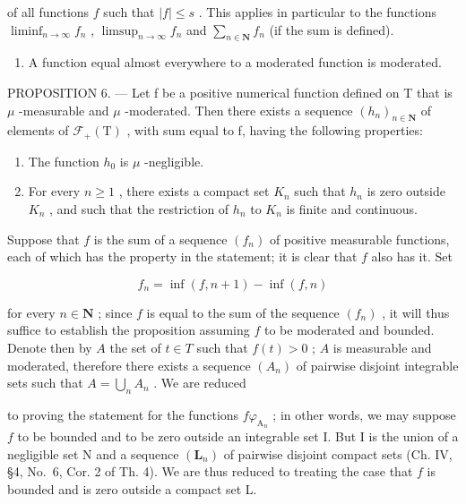 of all functions \(f\) such that \(|f| \leqslant s\) . This applies in particular to the functions \(\liminf_{n \to \infty} f_n\) , \(\limsup_{n \to \infty} f_n\) and \(\sum_{n \in \mathbf{N}} f_n\) (if the sum is defined).

\begin{enumerate}
\def\labelenumi{\arabic{enumi})}
\setcounter{enumi}{3}
\tightlist
\item
  A function equal almost everywhere to a moderated function is moderated.
\end{enumerate}

PROPOSITION 6. --- Let f be a positive numerical function defined on T that is \(\mu\) -measurable and \(\mu\) -moderated. Then there exists a sequence \((h_{n})_{n\in\mathbf{N}}\) of elements of \(\mathcal{F}_{+}(\mathrm{T})\) , with sum equal to f, having the following properties:

\begin{enumerate}
\def\labelenumi{\arabic{enumi})}
\item
  The function \(h_0\) is \(\mu\) -negligible.
\item
  For every \(n \geqslant 1\) , there exists a compact set \(K_{n}\) such that \(h_{n}\) is zero outside \(K_{n}\) , and such that the restriction of \(h_{n}\) to \(K_{n}\) is finite and continuous.
\end{enumerate}

Suppose that \(f\) is the sum of a sequence \((f_n)\) of positive measurable functions, each of which has the property in the statement; it is clear that \(f\) also has it. Set

\[
f _ {n} = \inf (f, n + 1) - \inf (f, n)
\]

for every \(n \in \mathbf{N}\) ; since \(f\) is equal to the sum of the sequence \((f_n)\) , it will thus suffice to establish the proposition assuming \(f\) to be moderated and bounded. Denote then by \(A\) the set of \(t \in T\) such that \(f(t) > 0\) ; \(A\) is measurable and moderated, therefore there exists a sequence \((A_n)\) of pairwise disjoint integrable sets such that \(A = \bigcup_{n} A_n\) . We are reduced

to proving the statement for the functions \(f\varphi_{\mathrm{A}_n}\) ; in other words, we may suppose \(f\) to be bounded and to be zero outside an integrable set I. But I is the union of a negligible set N and a sequence \((\mathbf{L}_n)\) of pairwise disjoint compact sets (Ch. IV, §4, No.~6, Cor. 2 of Th. 4). We are thus reduced to treating the case that \(f\) is bounded and is zero outside a compact set L.

